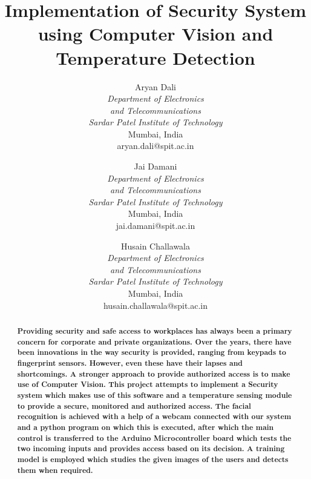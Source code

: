 \documentclass[conference]{IEEEtran}
\begin{document}
	
	\title{Implementation of Security System using Computer Vision and Temperature Detection}
	
	
	\author{
		Aryan Dali\\
		\textit{Department of Electronics}\\
		\textit{and Telecommunications}\\
		\textit{Sardar Patel Institute of Technology}\\
		Mumbai, India\\
		aryan.dali@spit.ac.in
		\and
		Jai Damani\\
		\textit{Department of Electronics}\\
		\textit{and Telecommunications}\\
		\textit{Sardar Patel Institute of Technology}\\
		Mumbai, India\\
		jai.damani@spit.ac.in
		\and
		Husain Challawala\\
		\textit{Department of Electronics}\\
		\textit{and Telecommunications}\\
		\textit{Sardar Patel Institute of Technology}\\
		Mumbai, India\\
		husain.challawala@spit.ac.in\\

	}
	
	
	\maketitle
	
	\begin{abstract}
		\textbf{Providing security and safe access to workplaces has always     been a primary concern for
			corporate and private organizations. Over the years,
			there have been innovations in the way security is
			provided, ranging from keypads to fingerprint sensors.
			However, even these have their lapses and
			shortcomings. A stronger approach to provide
			authorized access is to make use of Computer Vision. This project attempts to implement a Security system which makes use of this software and a
			temperature sensing module to provide a secure,
			monitored and authorized access. The facial recognition
			is achieved with a help of a webcam connected with our system and a python program on which this is executed,
			after which the main control is transferred to the Arduino
			Microcontroller board which tests the two incoming
			inputs and provides access based on its decision. A training model is employed which studies the given
			images of the users and detects them when required.\\}
	\end{abstract}
	
\end{document}
